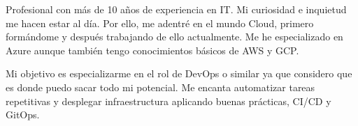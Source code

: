 

\begin{cvparagraph}


Profesional con más de 10 años de experiencia en IT. Mi curiosidad e inquietud me hacen estar al día. Por ello, me adentré en el mundo Cloud, primero formándome y después trabajando de ello actualmente. Me he especializado en Azure aunque también tengo conocimientos básicos de AWS y GCP.

Mi objetivo es especializarme en el rol de DevOps o similar ya que considero que es donde puedo sacar todo mi potencial. Me encanta automatizar tareas repetitivas y desplegar infraestructura aplicando buenas prácticas, CI/CD y GitOps.
\end{cvparagraph}
